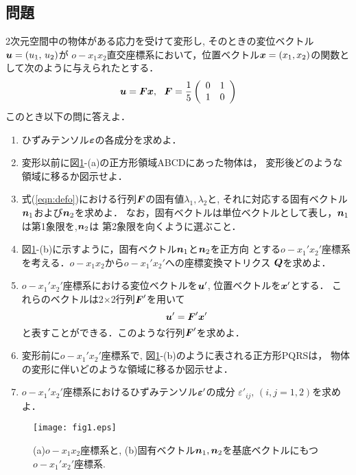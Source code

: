 \documentclass[10pt,a4j]{jbook}
\begin{document}
\subsection{問題}
2次元空間中の物体がある応力を受けて変形し, そのときの変位ベクトル$\mbox{\boldmath $u$}=(u_1, \, u_2)$が
$o-x_1x_2$直交座標系において，位置ベクトル$\mbox{\boldmath $x$}=(x_1, x_2)$の関数として次のように与えられたとする．
\begin{equation}
	\fat{u}
	=
	\fat{F}\fat{x}
	, \ \ 
	\fat{F}=
	\frac{1}{5}
	\left( 
		\begin{array}{cc}
		 0 & 1\\
		 1 & 0 
		\end{array}
	\right)
	\label{eqn:defo}
\end{equation}
このとき以下の問に答えよ．
\begin{enumerate}
\item
	ひずみテンソル$\mbox{\boldmath $\varepsilon$}$の各成分を求めよ．
\item
	変形以前に図\ref{fig:fig6_1}-(a)の正方形領域ABCDにあった物体は，
	変形後どのような領域に移るか図示せよ．
\item
	式(\ref{eqn:defo})における行列$\mbox{\boldmath $F$}$の固有値$\lambda_1, \lambda_2$と, 
	それに対応する固有ベクトル$\mbox{\boldmath $n$}_1$および$\mbox{\boldmath $n$}_2$を求めよ．	
	なお，固有ベクトルは単位ベクトルとして表し，$\mbox{\boldmath $n$}_1$は第1象限を,$\mbox{\boldmath $n$}_2$は
	第2象限を向くように選ぶこと．
\item
	図\ref{fig:fig6_1}-(b)に示すように，固有ベクトル$\mbox{\boldmath $n$}_1$と$\mbox{\boldmath $n$}_2$を正方向
	とする$o-x_1'x_2'$座標系を考える．$o-x_1x_2$から$o-x_1'x_2'$への座標変換マトリクス
	$\mbox{\boldmath $Q$}$を求めよ．
\item
	$o-x_1'x_2'$座標系における変位ベクトルを$\mbox{\boldmath $u$}'$, 位置ベクトルを$\mbox{\boldmath $x$}'$とする．
	これらのベクトルは2$\times$2行列$\mbox{\boldmath $F$}'$を用いて
	\[
		\mbox{\boldmath $u$}'=\mbox{\boldmath $F$}'\mbox{\boldmath $x$}'
	\]
	と表すことができる．このような行列$\mbox{\boldmath $F$}'$を求めよ．
\item
	変形前に$o-x_1'x_2'$座標系で, 図\ref{fig:fig6_1}-(b)のように表される正方形PQRSは，
	物体の変形に伴いどのような領域に移るか図示せよ．
\item
	$o-x_1'x_2'$座標系におけるひずみテンソル$\mbox{\boldmath $\varepsilon$}'$の成分
	$\varepsilon'_{ij}, \, (i,j=1,2)$を求めよ．
\end{enumerate}
\begin{figure}[h]
	\begin{center}
	\texttt{[image: fig1.eps]} 
	\end{center}
	\caption{(a)$o-x_1x_2$座標系と, (b)固有ベクトル$\mbox{\boldmath $n$}_1,\mbox{\boldmath $n$}_2$を基底ベクトルにもつ$o-x_1'x_2'$座標系.} 
	\label{fig:fig6_1}
\end{figure}

\end{document}
